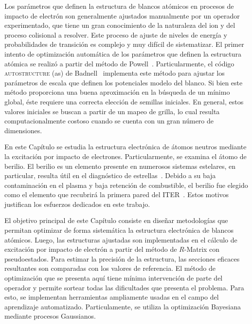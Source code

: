 Los parámetros que definen la estructura de blancos atómicos en procesos 
de impacto de electrón son generalmente ajustados manualmente por un 
operador experimentado, que tiene un gran conocimiento de la naturaleza 
del ion y del proceso colisional a resolver. Este proceso de ajuste de 
niveles de energía y probabilidades de transición es complejo y muy 
difícil de sistematizar. El primer intento de optimización automática de 
los parámetros que definen la estructura atómica se realizó a partir del 
método de Powell~\cite{Powell:64,NumRec:07}. Particularmente, el código 
\textsc{autostructure} (\acs{as}) de Badnell~\cite{Badnell:11} 
implementa este método para ajustar los parámetros de escala que definen 
los potenciales modelo del blanco. Si bien este método proporciona una 
buena aproximación en la búsqueda de un mínimo global, éste requiere una 
correcta elección de semillas iniciales. En general, estos valores 
iniciales se buscan a partir de un mapeo de grilla, lo cual resulta 
computacionalmente costoso cuando se cuenta con un gran número de 
dimensiones. 

En este Capítulo se estudia la estructura electrónica de átomos neutros
mediante la excitación por impacto de electrones. Particularmente, se 
examina el átomo de berilio. El berilio es un elemento presente en 
numerosos sistemas estelares, en particular, resulta útil en el 
diagnóstico de estrellas~\cite{Deliyannis:00}. Debido a su baja 
contaminación en el plasma y baja retención de combustible, el berilio 
fue elegido como el elemento que recubrirá la primera pared del 
ITER~\cite{Rubel:08}. Estos motivos justifican los esfuerzos dedicados 
en este trabajo.

El objetivo principal de este Capítulo consiste en diseñar metodologías 
que permitan optimizar de forma sistemática la estructura electrónica de 
blancos atómicos. Luego, las estructuras ajustadas son implementadas en 
el cálculo de excitación por impacto de electrón a partir del método de 
$R$-Matrix con pseudoestados. Para estimar la precisión de la estructura,
las secciones eficaces resultantes son comparadas con los valores de 
referencia. El método de optimización que se presenta aquí tiene mínima 
intervención de parte del operador y permite sortear todas las 
dificultades que presenta el problema. Para esto, se implementan 
herramientas ampliamente usadas en el campo del aprendizaje automatizado. 
Particulamente, se utiliza la optimización Bayesiana mediante procesos 
Gaussianos. 


